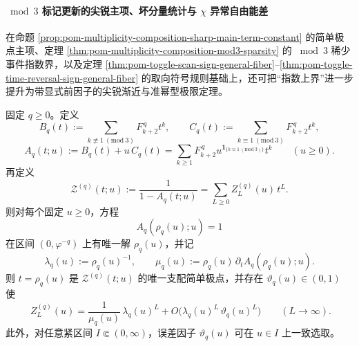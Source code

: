 \paragraph{\texorpdfstring{$\bmod 3$}{mod 3} 标记更新的尖锐主项、坏分量统计与 \texorpdfstring{$\chi$}{chi} 异常自由能差}
在命题 \ref{prop:pom-multiplicity-composition-sharp-main-term-constant} 的简单极点主项、定理 \ref{thm:pom-multiplicity-composition-mod3-sparsity} 的 \(\bmod 3\) 稀少事件指数界，以及定理 \ref{thm:pom-toggle-scan-sign-general-fiber}--\ref{thm:pom-toggle-time-reversal-sign-general-fiber} 的取向符号规则基础上，还可把“指数上界”进一步提升为带显式前因子的尖锐渐近与准幂型极限定理。

\begin{theorem}\label{thm:pom-multiplicity-composition-mod3-simple-pole-u}
固定 \(q\ge 0\)。定义
\[
B_q(t):=\sum_{k\not\equiv 1\ (\mathrm{mod}\ 3)}F_{k+2}^{\,q}t^k,
\qquad
C_q(t):=\sum_{k\equiv 1\ (\mathrm{mod}\ 3)}F_{k+2}^{\,q}t^k,
\]
\[
A_q(t;u):=B_q(t)+u\,C_q(t)
=\sum_{k\ge 1}F_{k+2}^{\,q}u^{\mathbf 1_{\{k\equiv 1\ (\mathrm{mod}\ 3)\}}}t^k
\qquad (u\ge 0).
\]
再定义
\[
\mathcal Z^{(q)}(t;u):=\frac{1}{1-A_q(t;u)}
=\sum_{L\ge 0}Z_L^{(q)}(u)\,t^L.
\]
则对每个固定 \(u\ge 0\)，方程
\[
A_q(\rho_q(u);u)=1
\]
在区间 \((0,\varphi^{-q})\) 上有唯一解 \(\rho_q(u)\)，并记
\[
\lambda_q(u):=\rho_q(u)^{-1},
\qquad
\mu_q(u):=\rho_q(u)\,\partial_tA_q(\rho_q(u);u).
\]
则 \(t=\rho_q(u)\) 是 \(\mathcal Z^{(q)}(t;u)\) 的唯一支配简单极点，并存在 \(\vartheta_q(u)\in(0,1)\) 使
\begin{equation}\label{eq:pom-multiplicity-composition-mod3-simple-pole-u}
\boxed{\;
Z_L^{(q)}(u)
=
\frac{1}{\mu_q(u)}\,\lambda_q(u)^L
+ O\!\bigl(\lambda_q(u)^L\,\vartheta_q(u)^L\bigr)
\qquad (L\to\infty).}
\end{equation}
此外，对任意紧区间 \(I\Subset(0,\infty)\)，误差因子 \(\vartheta_q(u)\) 可在 \(u\in I\) 上一致选取。
\end{theorem}
